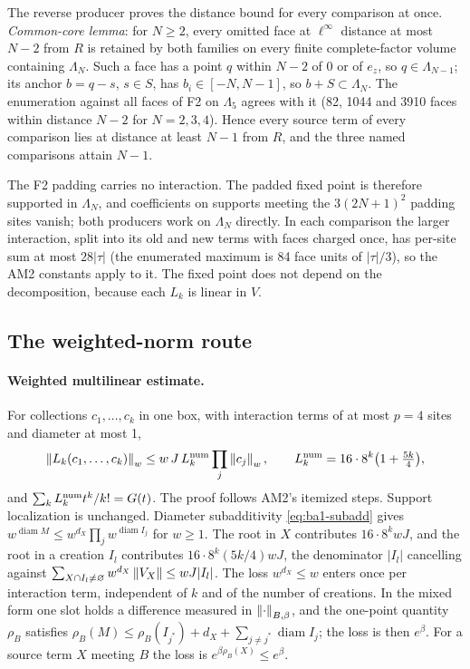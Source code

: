The reverse producer proves the distance bound for every comparison at once.
\emph{Common-core lemma}: for $N\ge2$, every omitted face at $\ell^\infty$
distance at most $N-2$ from $R$ is retained by both families on every finite
complete-factor volume containing $\Lambda_N$. Such a face has a point $q$
within $N-2$ of $0$ or of $e_z$, so $q\in\Lambda_{N-1}$; its anchor $b=q-s$,
$s\in S$, has $b_i\in[-N,N-1]$, so $b+S\subset\Lambda_N$. The enumeration
against all faces of F2 on $\Lambda_5$ agrees with it (82, 1044 and 3910 faces
within distance $N-2$ for $N=2,3,4$). Hence every source term of every
comparison lies at distance at least $N-1$ from $R$, and the three named
comparisons attain $N-1$.

The F2 padding carries no interaction. The padded fixed point is therefore
supported in $\Lambda_N$, and coefficients on supports meeting the $3(2N+1)^2$
padding sites vanish; both producers work on $\Lambda_N$ directly. In each
comparison the larger interaction, split into its old and new terms with
faces charged once, has per-site sum at most $28|\tau|$ (the enumerated
maximum is 84 face units of $|\tau|/3$), so the AM2 constants apply to it.
The fixed point does not depend on the decomposition, because each $L_k$ is
linear in $V$.

\subsection{The weighted-norm route}
\label{sec:ba1-weighted}
\paragraph{Weighted multilinear estimate.} For collections $c_1,\ldots,c_k$ in
one box, with interaction terms of at most $p=4$ sites and diameter at most 1,
\begin{equation}
 \left\lVert L_k(c_1,\ldots,c_k)\right\rVert_w\le w\,J\,L_k^{\rm num}\prod_j\left\lVert c_j\right\rVert_w,\qquad
 L_k^{\rm num}=16\cdot8^k\bigl(1+\tfrac{5k}{4}\bigr),
 \label{eq:ba1-multilinear}
\end{equation}
and $\sum_kL_k^{\rm num}t^k/k!=G(t)$. The proof follows AM2's itemized steps.
Support localization is unchanged. Diameter subadditivity
\eqref{eq:ba1-subadd} gives
$w^{\operatorname{diam}M}\le w^{d_X}\prod_jw^{\operatorname{diam}I_j}$ for
$w\ge1$. The root in $X$ contributes $16\cdot8^kwJ$, and the root in a
creation $I_l$ contributes $16\cdot8^k(5k/4)wJ$, the denominator $|I_l|$
cancelling against $\sum_{X\cap I_l\ne\varnothing}w^{d_X}\left\lVert V_X\right\rVert\le
wJ|I_l|$. The loss $w^{d_X}\le w$ enters once per interaction term,
independent of $k$ and of the number of creations. In the mixed form one slot
holds a difference measured in $\left\lVert\cdot\right\rVert_{B,\beta}$, and the one-point
quantity $\rho_B$ satisfies
$\rho_B(M)\le\rho_B(I_{j^*})+d_X+\sum_{j\ne j^*}\operatorname{diam}I_j$; the
loss is then $e^\beta$. For a source term $X$ meeting $B$ the loss is
$e^{\beta\rho_B(X)}\le e^\beta$.

